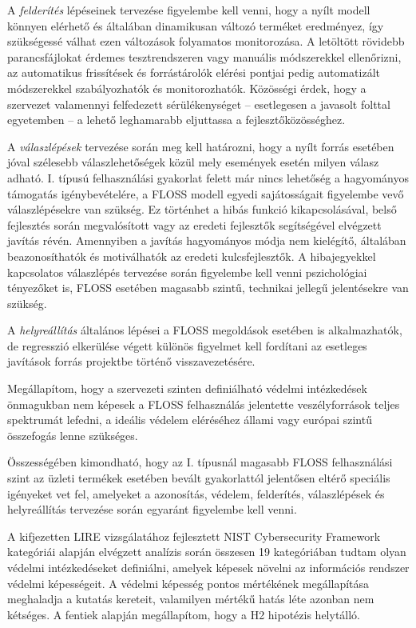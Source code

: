 \documentclass[12pt,magyar,a4paper,oneside]{scrreprt}
\begin{document}
A \emph{felderítés} lépéseinek tervezése figyelembe kell venni, hogy a
nyílt modell könnyen elérhető és általában dinamikusan változó terméket
eredményez, így szükségessé válhat ezen változások folyamatos
monitorozása. A letöltött rövidebb parancsfájlokat érdemes
tesztrendszeren vagy manuális módszerekkel ellenőrizni, az automatikus
frissítések és forrástárolók elérési pontjai pedig automatizált
módszerekkel szabályozhatók és monitorozhatók. Közösségi érdek, hogy a
szervezet valamennyi felfedezett sérülékenységet -- esetlegesen a
javasolt folttal egyetemben -- a lehető leghamarabb eljuttassa a
fejlesztőközösséghez.

A \emph{válaszlépések} tervezése során meg kell határozni, hogy a nyílt
forrás esetében jóval szélesebb válaszlehetőségek közül mely események
esetén milyen válasz adható. I. típusú felhasználási gyakorlat felett
már nincs lehetőség a hagyományos támogatás igénybevételére, a FLOSS
modell egyedi sajátosságait figyelembe vevő válaszlépésekre van szükség.
Ez történhet a hibás funkció kikapcsolásával, belső fejlesztés során
megvalósított vagy az eredeti fejlesztők segítségével elvégzett javítás
révén. Amennyiben a javítás hagyományos módja nem kielégítő, általában
beazonosíthatók és motiválhatók az eredeti kulcsfejlesztők. A
hibajegyekkel kapcsolatos válaszlépés tervezése során figyelembe kell
venni pszichológiai tényezőket is, FLOSS esetében magasabb szintű,
technikai jellegű jelentésekre van szükség.

A \emph{helyreállítás} általános lépései a FLOSS megoldások esetében is
alkalmazhatók, de regresszió elkerülése végett különös figyelmet kell
fordítani az esetleges javítások forrás projektbe történő
visszavezetésére.

Megállapítom, hogy a szervezeti szinten definiálható védelmi
intézkedések önmagukban nem képesek a FLOSS felhasználás jelentette
veszélyforrások teljes spektrumát lefedni, a ideális védelem eléréséhez
állami vagy európai szintű összefogás lenne szükséges.

Összességében kimondható, hogy az I. típusnál magasabb FLOSS
felhasználási szint az üzleti termékek esetében bevált gyakorlattól
jelentősen eltérő speciális igényeket vet fel, amelyeket a azonosítás,
védelem, felderítés, válaszlépések és helyreállítás tervezése során
egyaránt figyelembe kell venni.

A kifjezetten LIRE vizsgálatához fejlesztett NIST Cybersecurity
Framework kategóriái alapján elvégzett analízis során összesen 19
kategóriában tudtam olyan védelmi intézkedéseket definiálni, amelyek
képesek növelni az információs rendszer védelmi képességeit. A védelmi
képesség pontos mértékének megállapítása meghaladja a kutatás kereteit,
valamilyen mértékű hatás léte azonban nem kétséges. A fentiek alapján
megállapítom, hogy a H2 hipotézis helytálló.
\end{document}
